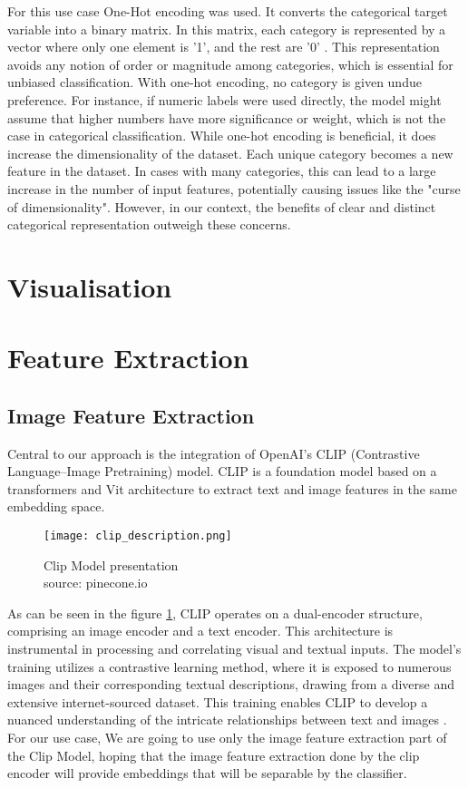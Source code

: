 For this use case One-Hot encoding was used. It converts the categorical target variable into a binary matrix. In this matrix, each category is represented by a vector where only one element is '1', and the rest are '0' \cite{cerda-2018}. This representation avoids any notion of order or magnitude among categories, which is essential for unbiased classification.
With one-hot encoding, no category is given undue preference. For instance, if numeric labels were used directly, the model might assume that higher numbers have more significance or weight, which is not the case in categorical classification.
While one-hot encoding is beneficial, it does increase the dimensionality of the dataset. Each unique category becomes a new feature in the dataset. In cases with many categories, this can lead to a large increase in the number of input features, potentially causing issues like the "curse of dimensionality"\cite{altman-2018}. However, in our context, the benefits of clear and distinct categorical representation outweigh these concerns.

\section{Visualisation}

\section{Feature Extraction}

\subsection{Image Feature Extraction}

Central to our approach is the integration of OpenAI's CLIP (Contrastive Language–Image Pretraining) model. CLIP is a foundation model based on a transformers and Vit architecture to extract text and image features in the same embedding space.


\begin{figure}[H]
    \centering
    \texttt{[image: clip\_description.png]}
    \caption{Clip Model presentation \\ source: pinecone.io}
    \label{fig:clip-architecture}
\end{figure}


As can be seen in the figure \ref{fig:clip-architecture}, CLIP operates on a dual-encoder structure, comprising an image encoder and a text encoder. This architecture is instrumental in processing and correlating visual and textual inputs. The model's training utilizes a contrastive learning method, where it is exposed to numerous images and their corresponding textual descriptions, drawing from a diverse and extensive internet-sourced dataset. This training enables CLIP to develop a nuanced understanding of the intricate relationships between text and images \cite{radford-2021}.
For our use case, We are going to use only the image feature extraction part of the Clip Model, hoping that the image feature extraction done by the clip encoder will provide embeddings that will be separable by the classifier.




